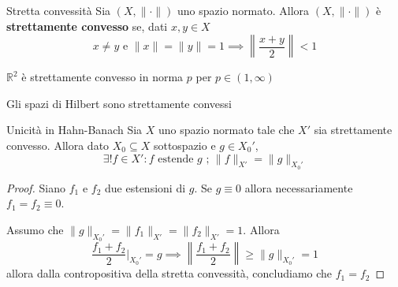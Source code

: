 \begin{definition}{Stretta convessità}
    Sia \({(X, \|\cdot \|)}\) uno spazio normato. Allora \({(X, \|\cdot \|)}\) è
    \textbf{strettamente convesso} se, dati \(
    x, y \in X\) 
    \[
      x\neq y \text{ e }\|x\| = \|y\| = 1 \implies \left\|\frac{x+y}{2}\right\| < 1
    \]
\end{definition}
\begin{example}{}
    \(\mathbb{R}^2\) è strettamente convesso in norma \(p\) per \(p \in (1, \infty)\) 
\end{example}
\begin{example}[Spoiler]
    Gli spazi di Hilbert sono strettamente convessi
\end{example}
\begin{proposition}{Unicità in Hahn-Banach}
    Sia \(X\) uno spazio normato tale che \(X'\) sia strettamente convesso.
    Allora dato \(X_{0} \subseteq X \) sottospazio e \(g \in X_{0}'\), 
    \[
      \exists ! f \in X' : f \text{ estende } g \text{ ; } \|f\|_{X'}  = \|g\|_{X_{0}'} 
    \]
\end{proposition}
\begin{proof}{}
    Siano \(f_{1}\) e \(f_{2}\) due estensioni di \(g\). Se \(g \equiv 0\)
    allora necessariamente \(f_{1} = f_{2} \equiv 0\).

    Assumo che \(\|g\|_{X_{0}'} = \|f_{1}\|_{X'}  = \|f_{2}\|_{X'} = 1\). Allora
    \[
      \frac{f_{1}+f_{2}}{2} \big|_{X_{0}'} = g \implies \left\|
      \frac{f_{1} + f_{2}}{2}\right\| \ge \|g\|_{X_{0}'} = 1
    \]
    allora dalla contropositiva della stretta convessità, concludiamo che \(f_{1} = f_{2}\) 
\end{proof}









